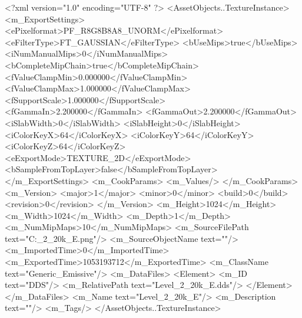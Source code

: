 <?xml version="1.0" encoding="UTF-8" ?>
<AssetObjects..TextureInstance>
	<m_ExportSettings>
		<ePixelformat>PF_R8G8B8A8_UNORM</ePixelformat>
		<eFilterType>FT_GAUSSIAN</eFilterType>
		<bUseMips>true</bUseMips>
		<iNumManualMips>0</iNumManualMips>
		<bCompleteMipChain>true</bCompleteMipChain>
		<fValueClampMin>0.000000</fValueClampMin>
		<fValueClampMax>1.000000</fValueClampMax>
		<fSupportScale>1.000000</fSupportScale>
		<fGammaIn>2.200000</fGammaIn>
		<fGammaOut>2.200000</fGammaOut>
		<iSlabWidth>0</iSlabWidth>
		<iSlabHeight>0</iSlabHeight>
		<iColorKeyX>64</iColorKeyX>
		<iColorKeyY>64</iColorKeyY>
		<iColorKeyZ>64</iColorKeyZ>
		<eExportMode>TEXTURE_2D</eExportMode>
		<bSampleFromTopLayer>false</bSampleFromTopLayer>
	</m_ExportSettings>
	<m_CookParams>
		<m_Values/>
	</m_CookParams>
	<m_Version>
		<major>1</major>
		<minor>0</minor>
		<build>0</build>
		<revision>0</revision>
	</m_Version>
	<m_Height>1024</m_Height>
	<m_Width>1024</m_Width>
	<m_Depth>1</m_Depth>
	<m_NumMipMaps>10</m_NumMipMaps>
	<m_SourceFilePath text="C:\Users\Shadow\Desktop\Prototypes\Level_2_20k_E.png"/>
	<m_SourceObjectName text=""/>
	<m_ImportedTime>0</m_ImportedTime>
	<m_ExportedTime>1053193712</m_ExportedTime>
	<m_ClassName text="Generic_Emissive"/>
	<m_DataFiles>
		<Element>
			<m_ID text="DDS"/>
			<m_RelativePath text="Level_2_20k_E.dds"/>
		</Element>
	</m_DataFiles>
	<m_Name text="Level_2_20k_E"/>
	<m_Description text=""/>
	<m_Tags/>
</AssetObjects..TextureInstance>

